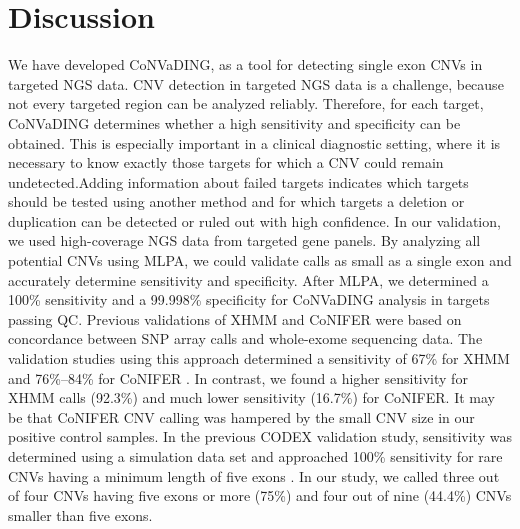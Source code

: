 \section{Discussion}\label{discussion}
We have developed CoNVaDING, as a tool for detecting single exon CNVs in targeted NGS data. 
CNV detection in targeted NGS data is a challenge, because not every targeted region can be analyzed reliably. 
Therefore, for each target, CoNVaDING determines whether a high sensitivity and specificity can be obtained. 
This is especially important in a clinical diagnostic setting, where it is necessary to know exactly those targets for which a CNV could remain undetected.Adding information about failed targets indicates which targets should be tested using another method and for which targets a deletion or duplication can be detected or ruled out with high confidence. In our validation, we used high-coverage NGS data from targeted gene panels. 
By analyzing all potential CNVs using MLPA, we could validate calls as small as a single exon and accurately determine sensitivity and specificity. After MLPA, we determined a 100\% sensitivity and a 99.998\% specificity for CoNVaDING analysis in targets passing QC. 
Previous validations of XHMM and CoNIFER were based on concordance between SNP array calls and whole-exome sequencing data. 
The validation studies using this approach determined a sensitivity of 67\% for XHMM \cite{Fromer_2012} and 76\%–84\% for CoNIFER \cite{Krumm_2012}. 
In contrast, we found a higher sensitivity for XHMM calls (92.3\%) and much lower sensitivity (16.7\%) for CoNIFER. 
It may be that CoNIFER CNV calling was hampered by the small CNV size in our positive control samples. 
In the previous CODEX validation study, sensitivity was determined using a simulation data set and approached 100\% sensitivity for rare CNVs having a minimum length of five exons \cite{Jiang_2015}. 
In our study, we called three out of four CNVs having five exons or more (75\%) and four out of nine (44.4\%) CNVs smaller than five exons.

